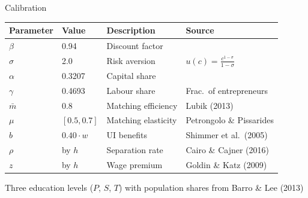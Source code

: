 \documentclass[aspectratio=169, 11pt]{beamer}
\begin{document}
\begin{frame}{Calibration}
    \begin{table}
        \centering
        \small
        \begin{tabular}{llll}
            \toprule
            Parameter & Value & Description & Source \\
            \midrule
            $\beta$ & 0.94 & Discount factor & \\
            $\sigma$ & 2.0 & Risk aversion & $u(c)=\frac{c^{1-\sigma}}{1-\sigma}$ \\
            $\alpha$ & 0.3207 & Capital share & \\
            $\gamma$ & 0.4693 & Labour share & Frac.\ of entrepreneurs \\
            $\bar{m}$ & 0.8 & Matching efficiency & Lubik (2013) \\
            $\mu$ & $[0.5, 0.7]$ & Matching elasticity & Petrongolo \& Pissarides \\
            $b$ & $0.40 \cdot w$ & UI benefits & Shimmer et al.\ (2005) \\
            $\rho$ & by $h$ & Separation rate & Cairo \& Cajner (2016) \\
            $z$ & by $h$ & Wage premium & Goldin \& Katz (2009) \\
            \bottomrule
        \end{tabular}
    \end{table}

    \vspace{0.3em}
    Three education levels ($P$, $S$, $T$) with population shares from Barro \& Lee (2013)
\end{frame}

\end{document}
